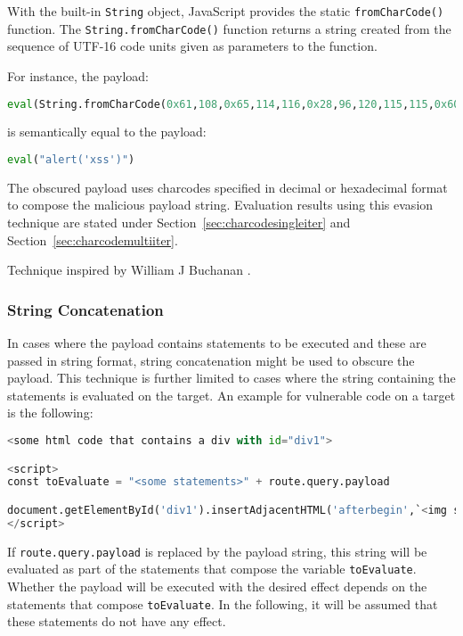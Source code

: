 With the built-in \verb|String| object, JavaScript provides the static \verb|fromCharCode()| function. The \verb|String.fromCharCode()| function returns a string created from the sequence of UTF-16 code units given as parameters to the function. \cite{js/fromCharCode}

For instance, the payload:

\begin{lstlisting}[style=basicStyle, language=Python]
eval(String.fromCharCode(0x61,108,0x65,114,116,0x28,96,120,115,115,0x60,0x29))
\end{lstlisting}

is semantically equal to the payload:

\begin{lstlisting}[style=basicStyle, language=Python]
eval("alert('xss')")
\end{lstlisting}

The obscured payload uses charcodes specified in decimal or hexadecimal format to compose the malicious payload string. Evaluation results using this evasion technique are stated under Section~\ref{sec:charcodesingleiter} and Section~\ref{sec:charcodemultiiter}.

Technique inspired by William J Buchanan \cite{asecsite/jsobf1}.

\subsubsection{String Concatenation}
\label{sec:stringconc}
In cases where the payload contains statements to be executed and these are passed in string format, string concatenation might be used to obscure the payload. This technique is further limited to cases where the string containing the statements is evaluated on the target. An example for vulnerable code on a target is the following:

\begin{lstlisting}[style=basicStyle, language=Python, caption=example code vulnerable to String Concatenation]
<some html code that contains a div with id="div1">

<script>
const toEvaluate = "<some statements>" + route.query.payload

document.getElementById('div1').insertAdjacentHTML('afterbegin',`<img src=0 onerror=${eval(toEvaluate)}>`)
</script>
\end{lstlisting}

If \verb|route.query.payload| is replaced by the payload string, this string will be evaluated as part of the statements that compose the variable \verb|toEvaluate|. Whether the payload will be executed with the desired effect depends on the statements that compose \verb|toEvaluate|. In the following, it will be assumed that these statements do not have any effect.

